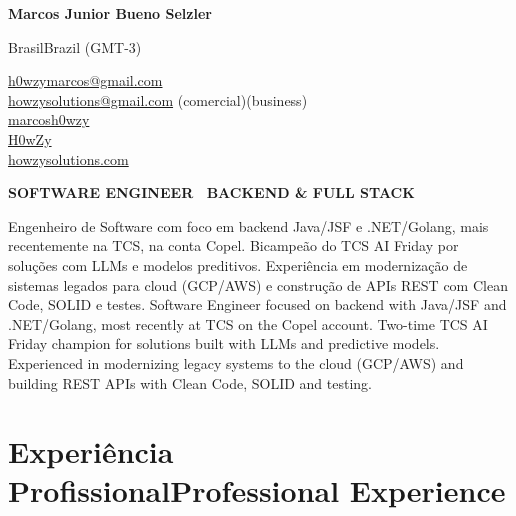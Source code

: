 \documentclass[a4paper,10pt]{article}
\newcommand{\tr}[2]{\ifdefined\CVPT #2\else #1\fi}
\begin{document}
\small
\setlength{\parskip}{4pt}
\setlength{\parindent}{0pt}


\noindent
\begin{minipage}[t]{0.5\textwidth}
{\Large \textbf{Marcos Junior Bueno Selzler}}

\vspace{0.4em}

\end{minipage}%
\begin{minipage}[t]{0.5\textwidth}
\raggedleft

\tr{Brazil}{Brasil} (GMT-3)

\href{mailto:h0wzymarcos@gmail.com}{\faEnvelope \space h0wzymarcos@gmail.com} \\
\href{mailto:howzysolutions@gmail.com}{\faBriefcase \space howzysolutions@gmail.com} \tr{(business)}{(comercial)} \\
\href{https://www.linkedin.com/in/marcosh0wzy/}{\faLinkedin \space marcosh0wzy} \\
\href{https://github.com/H0wZy}{\faGithub \space H0wZy} \\
\href{https://howzysolutions.com}{\faLink \space howzysolutions.com}

\end{minipage}

\vspace{1em}

\begin{center}
    \textbf{SOFTWARE ENGINEER \textbar\ BACKEND \& FULL STACK}
\end{center}

\vspace{0.4em}

\noindent
\tr{%
Software Engineer focused on backend with Java/JSF and .NET/Golang, most recently at TCS on the Copel account. Two-time TCS AI Friday champion for solutions built with LLMs and predictive models. Experienced in modernizing legacy systems to the cloud (GCP/AWS) and building REST APIs with Clean Code, SOLID and testing.%
}{%
Engenheiro de Software com foco em backend Java/JSF e .NET/Golang, mais recentemente na TCS, na conta Copel. Bicampeão do TCS AI Friday por soluções com LLMs e modelos preditivos. Experiência em modernização de sistemas legados para cloud (GCP/AWS) e construção de APIs REST com Clean Code, SOLID e testes.%
}

\section*{\tr{Professional Experience}{Experiência Profissional}}
\end{document}
